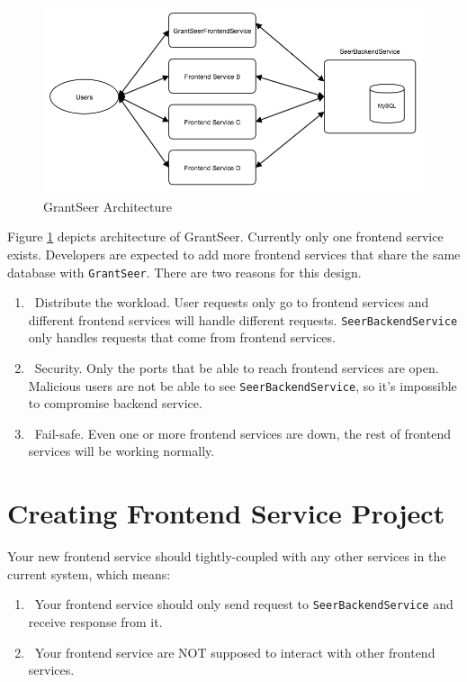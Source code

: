 \documentclass[12pt]{article}
\begin{document}
\begin{figure}[!htb]
	\caption{GrantSeer Architecture}
	\label{grantseer_architecture}
	\centering
	\includegraphics[width=\textwidth]{GrantSeerArchitecture.png}
\end{figure}

Figure \ref{grantseer_architecture} depicts architecture of GrantSeer. Currently only one frontend service exists. Developers are expected to add more frontend services that share the same database with \texttt{GrantSeer}. There are two reasons for this design.
\begin{enumerate}
	\item\ Distribute the workload. User requests only go to frontend services and different frontend services will handle different requests. \texttt{SeerBackendService} only handles requests that come from frontend services.
	\item\ Security. Only the ports that be able to reach frontend services are open. Malicious users are not be able to see \texttt{SeerBackendService}, so it's impossible to compromise backend service.
	\item\ Fail-safe. Even one or more frontend services are down, the rest of frontend services will be working normally.
\end{enumerate}

\section{Creating Frontend Service Project}
Your new frontend service should tightly-coupled with any other services in the current system, which means:
\begin{enumerate}
	\item\ Your frontend service should only send request to \texttt{SeerBackendService} and receive response from it.
	\item\ Your frontend service are NOT supposed to interact with other frontend services.
\end{enumerate}
\end{document}

